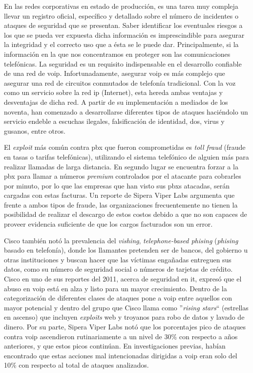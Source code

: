 \documentclass[a4paper,12pt]{report}
\begin{document}
 En las redes corporativas en estado de producción, es una tarea muy
compleja llevar un \mbox{registro} oficial, específico y detallado sobre el
número de incidentes o ataques de seguridad que se presentan. Saber
identificar los eventuales riesgos a los que se pueda ver expuesta dicha
información es imprescindible para asegurar la integridad y el correcto
uso que a ésta se le puede dar. \cite{espinoza}
Principalmente, si la información en la que nos concentramos en proteger
son las comunicaciones telefónicas. La seguridad es un requisito
indispensable en el desarrollo confiable de una red de \ac{voip}.
Infortunadamente, asegurar \ac{voip} es más complejo que asegurar una red
de circuitos conmutados de telefonía tradicional. Con la voz como un
servicio sobre la red \ac{ip} (Internet), esta hereda ambas ventajas y
desventajas de dicha red. A partir de su implementación a mediados de
los noventa, han comenzado a desarrollarse diferentes tipos de ataques
haciéndolo un servicio endeble a escuchas ilegales, falsificación de
identidad, \ac{dos}, virus y gusanos, entre otros.
\cite{collier}   

El \emph{exploit} más común contra \ac{pbx} que fueron comprometidas es \emph{toll fraud} 
(fraude en tasas o tarifas telefónicas), utilizando el sistema telefónico de alguien
más para realizar llamadas de larga distancia. En segundo lugar se encuentra forzar a la
\ac{pbx} para llamar a números \emph{premium} controlados por el atacante para cobrarles 
por minuto, por lo que las empresas que han visto sus \ac{pbx}s atacadas, serán cargadas 
con estas facturas. Un reporte de Sipera Viper Labs argumenta que frente a ambos tipos de fraude,
las organizaciones frecuentemente no tienen 
la posibilidad de realizar el descargo de estos costos debido a que no son capaces de 
proveer evidencia suficiente de que los cargos facturados son un error.

Cisco también notó la prevalencia del \emph{vishing}, \emph{telephone-based phising} (\emph{phising}
basado en telefonía), donde los llamantes pretenden ser de bancos, del gobierno u otras
instituciones y buscan hacer que las víctimas engañadas entreguen sus datos, 
como su número de seguridad social o números de tarjetas de crédito. Cisco en uno de sus 
reportes del 2011, acerca de seguridad en \ac{it}, expresó
que el abuso en \ac{voip} está en alza y listo para un \mbox{mayor} crecimiento. Dentro de la
categorización de diferentes clases de ataques pone a \ac{voip} entre aquellos con mayor
potencial y dentro del grupo que Cisco llama como ''\emph{rising stars}`` (estrellas en
ascenso) que incluyen \emph{exploits} web y troyanos para robo de datos y lavado de dinero. 
Por su parte, Sipera Viper Labs notó que los porcentajes pico de ataques contra \ac{voip}
ascendieron rutinariamente a un nivel de 30\% con respecto a años anteriores, y que estos
picos continúan. En investigaciones previas, habían encontrado que estas acciones mal 
intencionadas dirigidas a \ac{voip} eran solo del 10\% con respecto al total de ataques
 analizados. \cite{greene}
\end{document}
